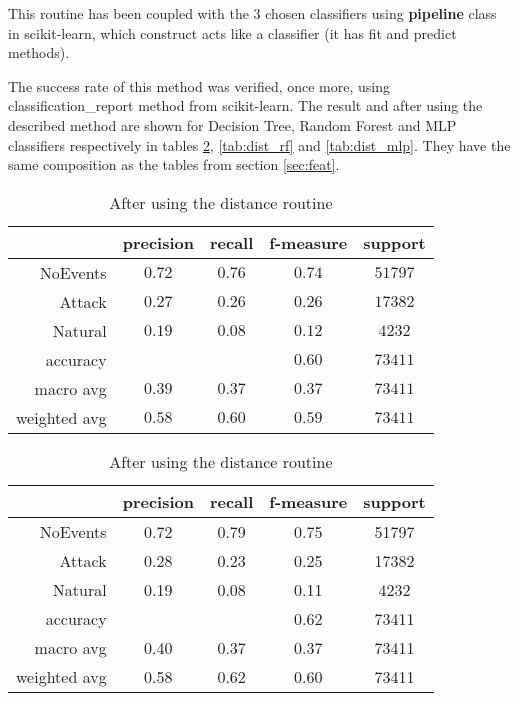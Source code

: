 This routine has been coupled with the 3 chosen classifiers using \textbf{pipeline} class in scikit-learn, which construct acts like a classifier (it has fit and predict methods). 

The success rate of this method was verified, once more, using classification\_report method from scikit-learn. The result and after using the described method are shown for Decision Tree, Random Forest and MLP classifiers respectively in tables \ref{tab:dist_dt}, \ref{tab:dist_rf} and \ref{tab:dist_mlp}. They have the same composition as the tables from section \ref{sec:feat}.

\begin{table}[H]
    \centering \footnotesize
    \caption{Distance routine results for Decision Tree classifier}  \label{tab:dist_dt}
    \begin{subtable}[t]{.5\linewidth}
        \centering
        \caption{Before using the distance routine} 
        \begin{tabular}{rcccc}\toprule
            & precision    &recall & f-measure  & support \\\midrule
                NoEvents  &   $  0.72 $  &  $ 0.76 $  &  $ 0.74 $  & $ 51797 $\\
                  Attack   &  $  0.27 $   & $ 0.26 $  &  $ 0.26 $  & $ 17382 $\\
                 Natural   &  $  0.19 $   & $ 0.08 $  &  $ 0.12 $  & $  4232 $\\
                accuracy   &            &          &  $0.60$  &   $73411$ \\
               macro avg   &  $  0.39 $   & $ 0.37 $  &  $ 0.37 $  & $ 73411 $\\
            weighted avg   &  $  0.58 $  &  $ 0.60 $  &  $ 0.59 $ &  $ 73411 $\\\bottomrule
        \end{tabular}
    \end{subtable}%
    \begin{subtable}[t]{.5\linewidth}
        \centering
        \caption{After using the distance routine} 
        \begin{tabular}{rcccc}\toprule
         &   precision    &recall & f-measure &  support  \\\midrule
    
            NoEvents    &   0.72   &   0.79   &   0.75  &   51797 \\
              Attack    &   0.28   &   0.23   &   0.25  &   17382 \\
             Natural   &    0.19   &   0.08   &   0.11  &    4232 \\
        
            accuracy    &           &         &   0.62   &  73411 \\
           macro avg    &   0.40    &  0.37   &   0.37  &   73411 \\
        weighted avg   &   0.58   &   0.62   &   0.60   &  73411   \\  \bottomrule
        \end{tabular}
    \end{subtable}
\end{table}

